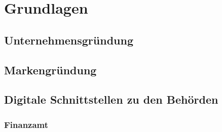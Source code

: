 \newpage

\section{Grundlagen} \label{grundlagen}

\subsection{Unternehmensgründung} \label{unternehmensgründung}


\subsection{Markengründung} \label{markengründung}


\subsection{Digitale Schnittstellen zu den Behörden} \label{digitaleBehoerden}

\subsubsection{Finanzamt} \label{finanzamt}
